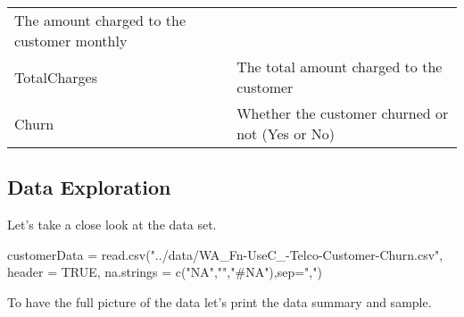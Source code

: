 \begin{longtable}[]{@{}ll@{}}
\begin{minipage}[t]{0.43\columnwidth}
The amount charged to the customer monthly\strut
\end{minipage}\tabularnewline
\begin{minipage}[t]{0.52\columnwidth}\raggedright
TotalCharges\strut
\end{minipage} & \begin{minipage}[t]{0.43\columnwidth}\raggedright
The total amount charged to the customer\strut
\end{minipage}\tabularnewline
\begin{minipage}[t]{0.52\columnwidth}\raggedright
Churn\strut
\end{minipage} & \begin{minipage}[t]{0.43\columnwidth}\raggedright
Whether the customer churned or not (Yes or No)\strut
\end{minipage}\tabularnewline
\bottomrule
\end{longtable}

\hypertarget{data-exploration}{%
\subsection{Data Exploration}\label{data-exploration}}

Let's take a close look at the data set.

\begin{Schunk}
\begin{Sinput}
customerData = read.csv("../data/WA_Fn-UseC_-Telco-Customer-Churn.csv", header = TRUE, na.strings = c("NA","","#NA"),sep=",")
\end{Sinput}
\end{Schunk}

To have the full picture of the data let's print the data summary and
sample.

